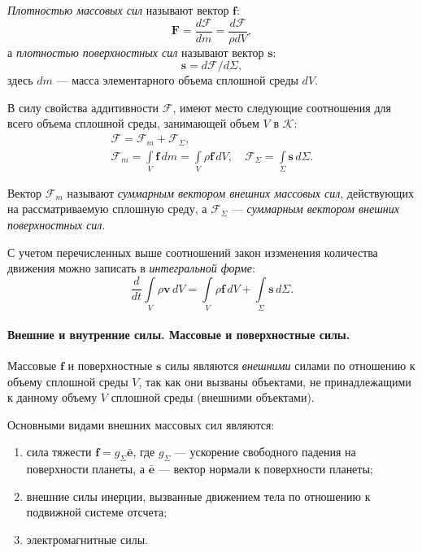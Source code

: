 \begin{definition*}
	\textit{Плотностью массовых сил} называют вектор $\mathbf{f}$:
	\begin{equation*}
		\mathbf{F} = \frac{d\mathcal{F}}{dm} = \frac{d\mathcal{F}}{\rho dV},
	\end{equation*}
	а \textit{плотностью поверхностных сил} называют вектор $\mathbf{s}$:
	\begin{equation*}
		\mathbf{s} = d\mathcal{F} / d\Sigma,
	\end{equation*}
	здесь $dm$ --- масса элементарного объема сплошной среды $dV$.
	
	
	В силу свойства аддитивности $\mathcal{F}$, имеют место следующие соотношения для всего объема сплошной среды, занимающей объем $V$ в $\mathcal{K}$:
	\begin{gather*}
		\mathcal{F} = \mathcal{F}_m + \mathcal{F}_{\Sigma}, \\
		\mathcal{F}_m = \int\limits_{V} \mathbf{f} \, dm = \int\limits_{V} \rho \mathbf{f} \, dV, \quad \mathcal{F}_{\Sigma} = \int\limits_{\Sigma} \mathbf{s} \, d\Sigma.
	\end{gather*}
	
	Вектор $\mathcal{F}_m$ называют \textit{суммарным вектором внешних массовых сил}, действующих на рассматриваемую сплошную среду, а $\mathcal{F}_{\Sigma}$ --- \textit{суммарным вектором внешних поверхностных сил}.
\end{definition*}

С учетом перечисленных выше соотношений закон иззменения количества движения можно записать в \textit{интегральной форме}:
\begin{equation*}
	\frac{d}{dt} \int\limits_{V} \rho \mathbf{v} \, dV = \int\limits_{V} \rho \mathbf{f} \, dV + \int\limits_{\Sigma} \mathbf{s} \, d\Sigma.
\end{equation*}

\paragraph{Внешние и внутренние силы. Массовые и поверхностные силы.} Массовые $\mathbf{f}$ и поверхностные $\mathbf{s}$ силы являются \textit{внешними} силами по отношению к объему сплошной среды $V$, так как они вызваны объектами, не принадлежащими к данному объему $V$ сплошной среды (внешними объектами). 

Основными видами внешних массовых сил являются: 
\begin{enumerate}
	\item сила тяжести $\mathbf{f} = g_{\Sigma} \bar{\mathbf{e}}$, где $g_{\Sigma}$ --- ускорение свободного падения на поверхности планеты, а $\bar{\mathbf{e}}$ --- вектор нормали к поверхности планеты;
	
	\item внешние силы инерции, вызванные движением тела по отношению к подвижной системе отсчета;
	
	\item электромагнитные силы. 
\end{enumerate}

